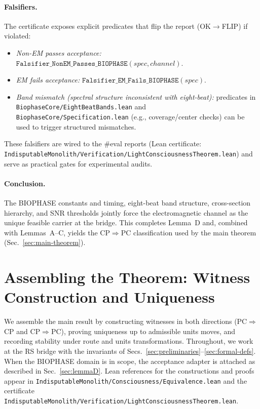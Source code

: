 \documentclass[12pt,a4paper]{article}
\begin{document}
\paragraph{Falsifiers.}
The certificate exposes explicit predicates that flip the report (OK\(\to\)FLIP) if violated:
\begin{itemize}
  \item \emph{Non-EM passes acceptance:}
    \(\texttt{Falsifier\_NonEM\_Passes\_BIOPHASE}(spec,channel)\).
  \item \emph{EM fails acceptance:}
    \(\texttt{Falsifier\_EM\_Fails\_BIOPHASE}(spec)\).
  \item \emph{Band mismatch (spectral structure inconsistent with eight-beat):}
    predicates in \texttt{BiophaseCore/EightBeatBands.lean} and \texttt{BiophaseCore/Specification.lean} (e.g., coverage/center checks) can be used to trigger structured mismatches.
\end{itemize}
These falsifiers are wired to the #eval reports (Lean certificate: \texttt{IndisputableMonolith/Verification/LightConsciousnessTheorem.lean}) and serve as practical gates for experimental audits.

\paragraph{Conclusion.}
The BIOPHASE constants and timing, eight-beat band structure, cross-section hierarchy, and SNR thresholds jointly force the electromagnetic channel as the unique feasible carrier at the bridge. This completes Lemma~D and, combined with Lemmas~A--C, yields the CP\(\Rightarrow\)PC classification used by the main theorem (Sec.~\ref{sec:main-theorem}).

\section{Assembling the Theorem: Witness Construction and Uniqueness}
\label{sec:witness-uniqueness}

We assemble the main result by constructing witnesses in both directions (PC\(\Rightarrow\)CP and CP\(\Rightarrow\)PC), proving uniqueness up to admissible units moves, and recording stability under route and units transformations. Throughout, we work at the RS bridge with the invariants of Secs.~\ref{sec:preliminaries}--\ref{sec:formal-defs}. When the BIOPHASE domain is in scope, the acceptance adapter is attached as described in Sec.~\ref{sec:lemmaD}. Lean references for the constructions and proofs appear in \texttt{IndisputableMonolith/Consciousness/Equivalence.lean} and the certificate \texttt{IndisputableMonolith/Verification/LightConsciousnessTheorem.lean}.
\end{document}
